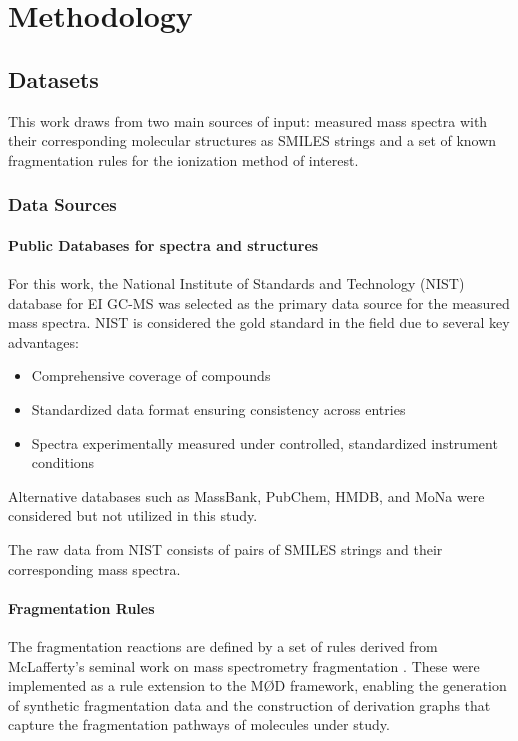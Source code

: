 \chapter{Methodology}
\label{ch:3}
\noindent

\section{Datasets}

This work draws from two main sources of input:
measured mass spectra with their corresponding molecular structures as SMILES strings and a set of known fragmentation rules for the ionization method of interest.

\subsection{Data Sources}

\subsubsection{Public Databases for spectra and structures}

For this work, the National Institute of Standards and Technology (NIST) database for EI GC-MS was selected as the primary data source for the measured mass spectra.
NIST is considered the gold standard in the field due to several key advantages: \cite[p.~3]{Wallace2023}

\begin{itemize}
    \item Comprehensive coverage of compounds
    \item Standardized data format ensuring consistency across entries
    \item Spectra experimentally measured under controlled, standardized instrument conditions
\end{itemize}

Alternative databases such as MassBank, PubChem, HMDB, and MoNa were considered but not utilized in this study.

The raw data from NIST consists of pairs of SMILES strings and their corresponding mass spectra.

\subsubsection{Fragmentation Rules}

The fragmentation reactions are defined by a set of rules derived from McLafferty's seminal work on mass spectrometry fragmentation \cite{McLafferty1993}.
These were implemented as a rule extension to the M\O D framework, enabling the generation of synthetic fragmentation data and the construction of derivation graphs that capture the fragmentation pathways of molecules under study.

